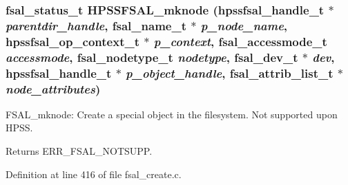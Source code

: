 \subsubsection[{HPSSFSAL\_\-mknode}]{\setlength{\rightskip}{0pt plus 5cm}fsal\_\-status\_\-t HPSSFSAL\_\-mknode (hpssfsal\_\-handle\_\-t $\ast$ {\em parentdir\_\-handle}, \/  fsal\_\-name\_\-t $\ast$ {\em p\_\-node\_\-name}, \/  hpssfsal\_\-op\_\-context\_\-t $\ast$ {\em p\_\-context}, \/  fsal\_\-accessmode\_\-t {\em accessmode}, \/  fsal\_\-nodetype\_\-t {\em nodetype}, \/  fsal\_\-dev\_\-t $\ast$ {\em dev}, \/  hpssfsal\_\-handle\_\-t $\ast$ {\em p\_\-object\_\-handle}, \/  fsal\_\-attrib\_\-list\_\-t $\ast$ {\em node\_\-attributes})}\label{fsal__create_8c_afd9ca4abfac845ff96efafa989d57dbd}
FSAL\_\-mknode: Create a special object in the filesystem. Not supported upon HPSS.

\begin{DoxyReturn}{Returns}
ERR\_\-FSAL\_\-NOTSUPP. 
\end{DoxyReturn}


Definition at line 416 of file fsal\_\-create.c.